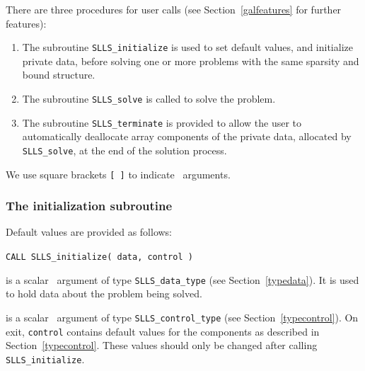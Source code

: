 \documentclass{galahad}
\newcommand{\packagename}{SLLS}
\begin{document}

\galarguments
There are three procedures for user calls
(see Section~\ref{galfeatures} for further features):

\begin{enumerate}
\item The subroutine
      {\tt \packagename\_initialize}
      is used to set default values, and initialize private data,
      before solving one or more problems with the
      same sparsity and bound structure.
\item The subroutine
      {\tt \packagename\_solve}
      is called to solve the problem.
\item The subroutine
      {\tt \packagename\_terminate}
      is provided to allow the user to automatically deallocate array
       components of the private data, allocated by
       {\tt \packagename\_solve},
       at the end of the solution process.
\end{enumerate}
We use square brackets {\tt [ ]} to indicate \optional\ arguments.


\subsubsection{The initialization subroutine}\label{subinit}
 Default values are provided as follows:
\vspace*{1mm}

\hspace{8mm}
{\tt CALL \packagename\_initialize( data, control )}

\vspace*{-3mm}
\begin{description}

 is a scalar \intentinout\ argument of type
{\tt \packagename\_data\_type}
(see Section~\ref{typedata}). It is used to hold data about the problem being
solved.

 is a scalar \intentout\ argument of type
{\tt \packagename\_control\_type}
(see Section~\ref{typecontrol}).
On exit, {\tt control} contains default values for the components as
described in Section~\ref{typecontrol}.
These values should only be changed after calling
{\tt \packagename\_initialize}.

\end{description}

\end{document}
